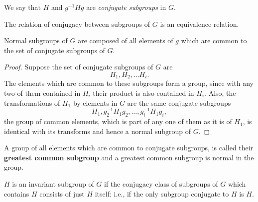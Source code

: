 We say that $H$ and $g^{-1} H g$ are {\it conjugate subgroups} in $G$. 

\begin{theorem}
The relation of conjugacy between subgroups of $G$ is an equivalence relation.
\end{theorem}

\begin{theorem}
Normal subgroups of $G$ are composed of all elements of $g$ which are common to the set of conjugate subgroups of $G$. 
\end{theorem}
\begin{proof}
Suppose the set of conjugate subgroups of $G$ are
\[ H_1, H_2, \hdots H_i.\]
The elements which are common to these subgroups form a group, since with any two of them contained in $H_i$ their product is also contained in $H_i$. 
Also, the transformations of $H_1$ by elements in $G$ are the same conjugate subgroups
\[ H_1, g_2^{-1}H_1 g_2, \hdots, g_i^{-1} H_1 g_i, \] the group of common elements, which is part of any one of them as it is of $H_1$, is identical with its 
transforms and hence a normal subgroup of $G$. 
\end{proof}
A group of all elements which are common to conjugate subgroups, is called their {\bf greatest common subgroup} and a greatest common subgroup 
is normal in the group. 

\begin{theorem}
$H$ is an invariant subgroup of $G$ if the conjugacy class of subgroups of $G$ which contains $H$ consists of just $H$ itself: i.e., if the only subgroup
conjugate to $H$ is $H$. 
\end{theorem}